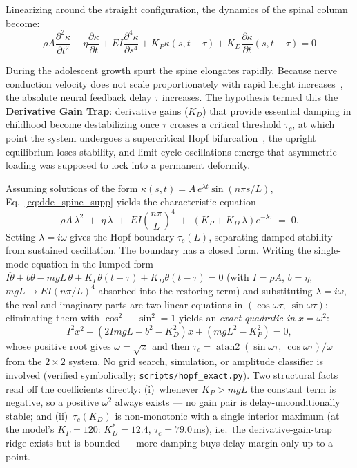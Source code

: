 Linearizing around the straight configuration, the dynamics of the spinal column become:
\begin{equation}
\rho A \frac{\partial^2 \kappa}{\partial t^2} + \eta \frac{\partial \kappa}{\partial t} + EI \frac{\partial^4 \kappa}{\partial s^4} + K_P \kappa(s, t-\tau) + K_D \frac{\partial \kappa}{\partial t}(s, t-\tau) = 0
\label{eq:dde_spine_supp}
\end{equation}

During the adolescent growth spurt the spine elongates rapidly. Because nerve conduction velocity does not scale proportionately with rapid height increases~\cite{lang1985nerve, robinson2001nerve}, the absolute neural feedback delay $\tau$ increases. The hypothesis termed this the \textbf{Derivative Gain Trap}: derivative gains ($K_D$) that provide essential damping in childhood become destabilizing once $\tau$ crosses a critical threshold $\tau_c$, at which point the system undergoes a supercritical Hopf bifurcation~\cite{landry2005dynamics}, the upright equilibrium loses stability, and limit-cycle oscillations emerge that asymmetric loading was supposed to lock into a permanent deformity.

Assuming solutions of the form $\kappa(s,t) = A\,e^{\lambda t}\sin(n\pi s/L)$, Eq.~\ref{eq:dde_spine_supp} yields the characteristic equation
\begin{equation}
\rho A\,\lambda^{2} \;+\; \eta\,\lambda \;+\; EI\left(\frac{n\pi}{L}\right)^{4} \;+\; \left(K_P + K_D\,\lambda\right)e^{-\lambda\tau} \;=\; 0 .
\label{eq:char_eq_supp}
\end{equation}
Setting $\lambda = i\omega$ gives the Hopf boundary $\tau_c(L)$, separating damped stability from sustained oscillation. The boundary has a closed form. Writing the single-mode equation in the lumped form $I\ddot\theta + b\dot\theta - mgL\,\theta + K_P\theta(t-\tau) + K_D\dot\theta(t-\tau) = 0$ (with $I = \rho A$, $b = \eta$, $mgL \to EI(n\pi/L)^4$ absorbed into the restoring term) and substituting $\lambda = i\omega$, the real and imaginary parts are two linear equations in $(\cos\omega\tau,\ \sin\omega\tau)$; eliminating them with $\cos^2 + \sin^2 = 1$ yields an \emph{exact quadratic in} $x = \omega^2$:
\begin{equation}
I^2 x^2 + \left(2 I mgL + b^2 - K_D^2\right) x + \left(mgL^2 - K_P^2\right) = 0,
\label{eq:hopf_quadratic_supp}
\end{equation}
whose positive root gives $\omega = \sqrt{x}$ and then $\tau_c = \operatorname{atan2}(\sin\omega\tau,\ \cos\omega\tau)/\omega$ from the $2\times 2$ system. No grid search, simulation, or amplitude classifier is involved (verified symbolically; \texttt{scripts/hopf\_exact.py}). Two structural facts read off the coefficients directly: (i)~whenever $K_P > mgL$ the constant term is negative, so a positive $\omega^2$ always exists --- no gain pair is delay-unconditionally stable; and (ii)~$\tau_c(K_D)$ is non-monotonic with a single interior maximum (at the model's $K_P = 120$: $K_D^* = 12.4$, $\tau_c = 79.0$\,ms), i.e.\ the derivative-gain-trap ridge exists but is bounded --- more damping buys delay margin only up to a point.

